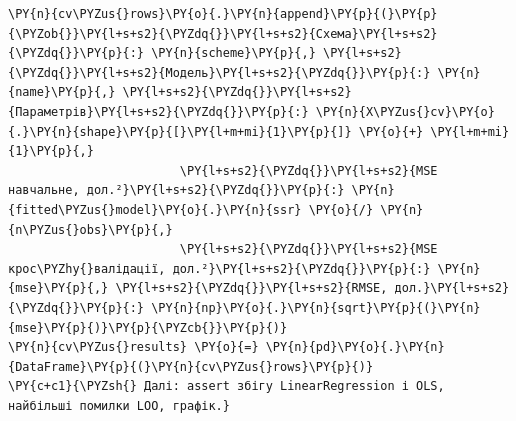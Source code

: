 \begin{Verbatim}[commandchars=\\\{\}]
        \PY{n}{cv\PYZus{}rows}\PY{o}{.}\PY{n}{append}\PY{p}{(}\PY{p}{\PYZob{}}\PY{l+s+s2}{\PYZdq{}}\PY{l+s+s2}{Схема}\PY{l+s+s2}{\PYZdq{}}\PY{p}{:} \PY{n}{scheme}\PY{p}{,} \PY{l+s+s2}{\PYZdq{}}\PY{l+s+s2}{Модель}\PY{l+s+s2}{\PYZdq{}}\PY{p}{:} \PY{n}{name}\PY{p}{,} \PY{l+s+s2}{\PYZdq{}}\PY{l+s+s2}{Параметрів}\PY{l+s+s2}{\PYZdq{}}\PY{p}{:} \PY{n}{X\PYZus{}cv}\PY{o}{.}\PY{n}{shape}\PY{p}{[}\PY{l+m+mi}{1}\PY{p}{]} \PY{o}{+} \PY{l+m+mi}{1}\PY{p}{,}
                        \PY{l+s+s2}{\PYZdq{}}\PY{l+s+s2}{MSE навчальне, дол.²}\PY{l+s+s2}{\PYZdq{}}\PY{p}{:} \PY{n}{fitted\PYZus{}model}\PY{o}{.}\PY{n}{ssr} \PY{o}{/} \PY{n}{n\PYZus{}obs}\PY{p}{,}
                        \PY{l+s+s2}{\PYZdq{}}\PY{l+s+s2}{MSE крос\PYZhy{}валідації, дол.²}\PY{l+s+s2}{\PYZdq{}}\PY{p}{:} \PY{n}{mse}\PY{p}{,} \PY{l+s+s2}{\PYZdq{}}\PY{l+s+s2}{RMSE, дол.}\PY{l+s+s2}{\PYZdq{}}\PY{p}{:} \PY{n}{np}\PY{o}{.}\PY{n}{sqrt}\PY{p}{(}\PY{n}{mse}\PY{p}{)}\PY{p}{\PYZcb{}}\PY{p}{)}
\PY{n}{cv\PYZus{}results} \PY{o}{=} \PY{n}{pd}\PY{o}{.}\PY{n}{DataFrame}\PY{p}{(}\PY{n}{cv\PYZus{}rows}\PY{p}{)}
\PY{c+c1}{\PYZsh{} Далі: assert збігу LinearRegression і OLS, найбільші помилки LOO, графік.}
\end{Verbatim}
